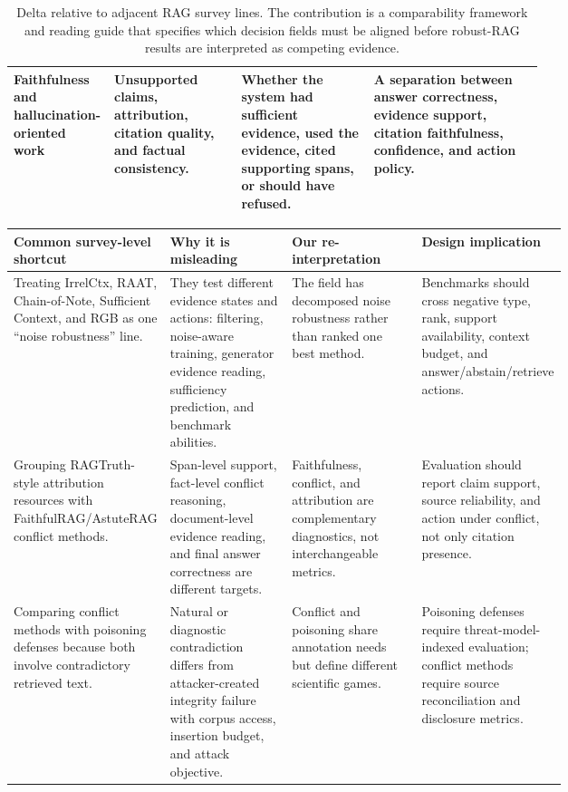 \begin{table}[t]
\begin{tabularx}{\linewidth}{>{\raggedright\arraybackslash}p{0.19\linewidth}>{\raggedright\arraybackslash}p{0.24\linewidth}>{\raggedright\arraybackslash}p{0.25\linewidth}X}
Faithfulness and hallucination-oriented work & Unsupported claims, attribution, citation quality, and factual consistency. & Whether the system had sufficient evidence, used the evidence, cited supporting spans, or should have refused. & A separation between answer correctness, evidence support, citation faithfulness, confidence, and action policy. \\
\bottomrule
\end{tabularx}
\caption{Delta relative to adjacent RAG survey lines. The contribution is a comparability framework and reading guide that specifies which decision fields must be aligned before robust-RAG results are interpreted as competing evidence.}
\label{tab:prior-survey-delta-main}
\end{table}

\iffalse
\begin{table}[t]
\centering
\scriptsize
\renewcommand{\arraystretch}{0.9}
\begin{tabularx}{\linewidth}{>{\raggedright\arraybackslash}p{0.22\linewidth}>{\raggedright\arraybackslash}p{0.24\linewidth}>{\raggedright\arraybackslash}p{0.25\linewidth}X}
\toprule
\textbf{Common survey-level shortcut} & \textbf{Why it is misleading} & \textbf{Our re-interpretation} & \textbf{Design implication} \\
\midrule
Treating IrrelCtx, RAAT, Chain-of-Note, Sufficient Context, and RGB as one ``noise robustness'' line. & They test different evidence states and actions: filtering, noise-aware training, generator evidence reading, sufficiency prediction, and benchmark abilities. & The field has decomposed noise robustness rather than ranked one best method. & Benchmarks should cross negative type, rank, support availability, context budget, and answer/abstain/retrieve actions. \\
Grouping RAGTruth-style attribution resources with FaithfulRAG/AstuteRAG conflict methods. & Span-level support, fact-level conflict reasoning, document-level evidence reading, and final answer correctness are different targets. & Faithfulness, conflict, and attribution are complementary diagnostics, not interchangeable metrics. & Evaluation should report claim support, source reliability, and action under conflict, not only citation presence. \\
Comparing conflict methods with poisoning defenses because both involve contradictory retrieved text. & Natural or diagnostic contradiction differs from attacker-created integrity failure with corpus access, insertion budget, and attack objective. & Conflict and poisoning share annotation needs but define different scientific games. & Poisoning defenses require threat-model-indexed evaluation; conflict methods require source reconciliation and disclosure metrics. \\

\end{tabularx}
\end{table}
